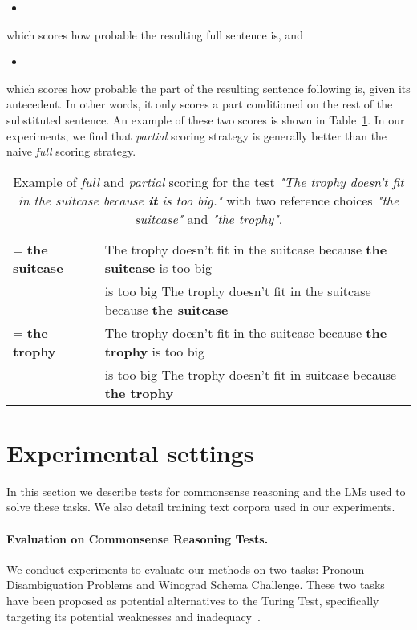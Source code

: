 \documentclass{article}
\begin{document}
\begin{itemize}
    \item 
\end{itemize}
which scores how probable the resulting full sentence is, and
\begin{itemize}
    \item 
\end{itemize}
which scores how probable the part of the resulting sentence following  is, given its antecedent. In other words, it only scores a part  conditioned on the rest of the substituted sentence. An example of these two scores is shown in Table~\ref{tab:scoring}. In our experiments, we find that \emph{partial} scoring strategy is generally better than the naive \emph{full} scoring strategy.


\begin{table}[h!]
  \scriptsize
  \caption{Example of \emph{full} and \emph{partial} scoring for the test {\it"The trophy doesn’t fit in the suitcase because \textbf{it} is too big."} with two reference choices {\it"the suitcase"} and {\it"the trophy"}.}
  \label{tab:scoring}
  \centering
  \begin{tabular}{l|l}
    \toprule
 = \textbf{the suitcase} &  The trophy doesn't fit in the suitcase because \textbf{the suitcase} is too big \\
    & is too big The trophy doesn't fit in the suitcase because \textbf{the suitcase}\\
\midrule
     = \textbf{the trophy} & The trophy doesn't fit in the suitcase because \textbf{the trophy} is too big \\& is too big The trophy doesn't fit in suitcase because \textbf{the trophy}\\
    \bottomrule
  \end{tabular}
\end{table}







\section{Experimental settings}


In this section we describe tests for commonsense reasoning and the LMs used to solve these tasks. We also detail training text corpora used in our experiments.



\paragraph{Evaluation on Commonsense Reasoning Tests.}  We conduct experiments to evaluate our methods on two tasks: Pronoun Disambiguation Problems and Winograd Schema Challenge. These two tasks have been proposed as potential alternatives to the Turing Test, specifically targeting its potential weaknesses and inadequacy~\cite{levesque2011winograd}.
\end{document}
